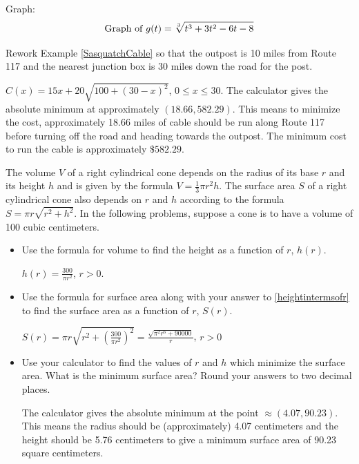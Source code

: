 \documentclass{ximera}
\begin{document}
\begin{question}
\begin{problem}
\begin{solution}
Graph:\\
$$\text{Graph of $g(t) = \sqrt[3]{t^{3} + 3t^{2} - 6t - 8}$}$$
\end{solution}

\end {problem}
\end{question}

\begin {problem}
Rework Example \ref{SasquatchCable} so that the outpost is 10 miles from Route 117 and the nearest junction box is 30 miles down the road for the post.
\begin{solution}
$C(x) = 15x+20\sqrt{100+(30-x)^2}$, $0 \leq x \leq 30$.  The calculator gives the absolute minimum at approximately $(18.66, 582.29)$.  This means to minimize the cost, approximately 18.66 miles of cable should be run along Route 117 before turning off the road and heading towards the outpost.  The minimum cost to run the cable is approximately $\$582.29$.
\end{solution}

\end {problem}

\begin {problem}
The volume $V$ of a right cylindrical cone depends on the radius of its base $r$ and its height $h$ and is given by the formula $V = \frac{1}{3} \pi r^2 h$.  The surface area $S$ of a right cylindrical cone also depends on $r$ and $h$ according to the formula $S = \pi r \sqrt{r^2+h^2}$.  In the following problems, suppose a cone is to have a volume of 100 cubic centimeters. 

\begin{itemize}
\item 
Use the formula for volume to find the height as a function of $r$, $h(r)$.

\begin{solution}
$h(r) = \frac{300}{\pi r^2}$, $r > 0$.
\end{solution}

\item
Use the formula for surface area along with  your answer to \ref{heightintermsofr} to find the surface area as a function of $r$, $S(r)$.

\begin{solution}
$S(r) = \pi r \sqrt{r^2+\left(\frac{300}{\pi r^2}\right)^2} = \frac{\sqrt{\pi^2 r^6+90000}}{r}$, $r>0$
\end{solution}

\item 
Use your calculator to find the values of $r$ and $h$ which minimize the surface area.  What is the minimum surface area?  Round your answers to two decimal places.

\begin{solution}
The calculator gives the absolute minimum at the point $\approx (4.07, 90.23)$.  This means the radius should be (approximately) 4.07 centimeters and the height should be 5.76 centimeters to give a minimum surface area of 90.23 square centimeters.
\end{solution}
\end{itemize}
\end {problem}
\end{document}
